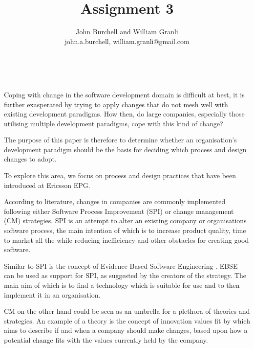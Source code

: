 \documentclass[times, 10pt,twocolumn]{Article}
\begin{document}
\title{Assignment 3}

\author{John Burchell and William Granli \\
john.a.burchell, william.granli@gmail.com}


\maketitle
\thispagestyle{empty}



​

Coping with change in the software development domain is difficult at best, it is further exasperated by trying to apply changes that do not mesh well with existing development paradigms. How then, do large companies, especially those utilising multiple development paradigms, cope with this kind of change?

The purpose of this paper is therefore to determine whether an organisation's development paradigm should be the basis for deciding which process and design changes to adopt. 

To explore this area, we focus on process and design practices that have been introduced at Ericsson EPG.


According to literature, changes in companies are commonly implemented following either Software Process Improvement (SPI)\cite{pettersson2008practitioner}\cite{unterkalmsteiner2012evaluation} or change management (CM) strategies. SPI is an attempt to alter an existing company or organisations software process, the main intention of which is to increase product quality, time to market all the while reducing inefficiency and other obstacles for creating good software. 

Similar to SPI is the concept of Evidence Based Software Engineering \cite{dyba2005evidence}. EBSE can be used as support for SPI, as suggested by the creators of the strategy. The main aim of which is to find a technology which is suitable for use and to then implement it in an organisation.

CM on the other hand could be seen as an umbrella for a plethora of theories and strategies. An example of a theory is the concept of innovation values fit by \cite{klein1996challenge} which aims to describe if and when a company should make changes, based upon how a potential change fits with the values currently held by the company.
\end{document}
